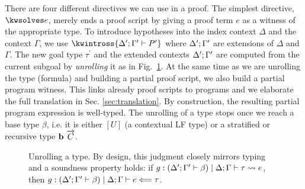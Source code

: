 There are four different directives we can use in a proof. The
simplest directive, $\kwsolves e$, merely ends a proof script by
giving a proof term $e$ as a witness of the appropriate type.
%
To introduce hypotheses into the index context $\Delta$ and the context
$\Gamma$, we use $\kwintross \hypoth{\goalctx{^\prime}}{P^\prime}$ where
$\Delta^\prime; \Gamma^\prime$ are extensions of $\Delta$ and $\Gamma$.
%
The new goal type $\tau^\prime$ and the extended contexts $\Delta^\prime; \Gamma^\prime$
are computed from the current subgoal by \emph{unrolling} it as in Fig.~\ref{fig:unroll}.
At the same time as we are unrolling the type (formula) and building a
partial proof script, we also build a partial program witness. This
links already proof scripts to programs and we elaborate the full
translation in Sec. \ref{sec:translation}. By construction, the
resulting partial program expression is well-typed.
The unrolling of a type stops once we reach a base type $\beta$,
i.e. it is either $[U]$ (a contextual LF type) or a stratified or recursive type $\textbf{b}~\overrightarrow{C}$.

\begin{figure}[h]
  
  \caption{%
    Unrolling a \Beluga{} type. By design, this judgment closely mirrors typing
    and a soundness property holds:
    if $g : (\Delta^\prime; \Gamma^\prime \vdash \beta) \mid \Delta; \Gamma \vdash \tau \rightsquigarrow e$, then
    $g : (\Delta^\prime; \Gamma^\prime \vdash \beta) \mid \Delta; \Gamma \vdash e \Longleftarrow \tau$.
  }
  \label{fig:unroll}
\end{figure}


%

